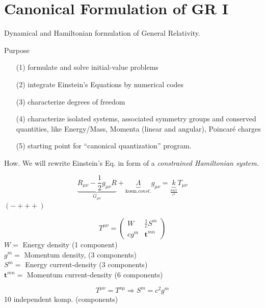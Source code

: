 \documentclass[10pt]{amsart}
\begin{document}
\begin{multicols*}{2}
	\section{}
	
	\section{Canonical Formulation of GR I}
	
	Dynamical and Hamiltonian formulation of General Relativity.
	
	Purpose
	\begin{enumerate}
		\item[(1)] formulate and solve initial-value problems
		\item[(2)] integrate Einstein's Equations by numerical codes
		\item[(3)] characterize degrees of freedom
		\item[(4)] characterize isolated systems, associated symmetry groups and conserved quantities, like Energy/Mass, Momenta (linear and angular), Poincar\'e charges
		\item[(5)] starting point for ``canonical quantization'' program.
	\end{enumerate}
	
	How. We will rewrite Einstein's Eq. in form of a \emph{constrained Hamiltonian system.}  
	
	\hrulefill
	
	\[
	\underbrace{R_{\mu \nu} - \frac{1}{2}g_{\mu \nu}R}_{G_{\mu \nu}} + \underbrace{\Lambda}_{\text{kosm.} const.} g_{\mu \nu} = \underbrace{k}_{ \frac{ 8 \pi G}{c^4} } T_{\mu \nu}   
	\]
	$(-+++)$
	
	\[
	T^{\mu \nu} = \left( \begin{matrix} W & \frac{1}{c} S^m \\
	c g^m & \mathbf{t}^{mn} \end{matrix} \right)
	\]
	$W = $ Energy density (1 component)\\
	$g^m =$ Momentum density, (3 components) \\
	$S^m = $ Energy current-density (3 components)\\
	$\mathbf{t}^{mn} = $ Momentum current-density (6 components)
	
	\[
	T^{\mu \nu} = T^{\nu \mu} \Longrightarrow S^m = c^2 g^m
	\]
	10 independent komp. (components)
	

\end{multicols*}
\end{document}
